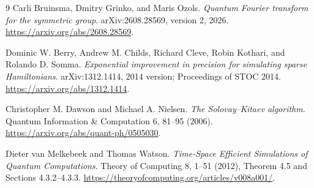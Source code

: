 \documentclass[11pt]{article}
\theoremstyle{definition}
\begin{document}
\begin{thebibliography}{9}
Carli Bruinsma, Dmitry Grinko, and Maris Ozols.
\emph{Quantum Fourier transform for the symmetric group}.
arXiv:2608.28569, version 2, 2026.
\url{https://arxiv.org/abs/2608.28569}.

Dominic W. Berry, Andrew M. Childs, Richard Cleve, Robin Kothari, and
Rolando D. Somma.
\emph{Exponential improvement in precision for simulating sparse Hamiltonians}.
arXiv:1312.1414, 2014 version; Proceedings of STOC 2014.
\url{https://arxiv.org/abs/1312.1414}.

Christopher M. Dawson and Michael A. Nielsen.
\emph{The Solovay--Kitaev algorithm}.
Quantum Information \& Computation 6, 81--95 (2006).
\url{https://arxiv.org/abs/quant-ph/0505030}.

Dieter van Melkebeek and Thomas Watson.
\emph{Time-Space Efficient Simulations of Quantum Computations}.
Theory of Computing 8, 1--51 (2012), Theorem 4.5 and Sections 4.3.2--4.3.3.
\url{https://theoryofcomputing.org/articles/v008a001/}.
\end{thebibliography}
\end{document}

